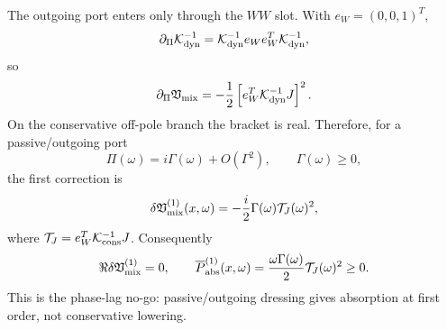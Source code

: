 The outgoing port enters only through the \(WW\) slot.  With \(e_W=(0,0,1)^T\),
\begin{equation}
\label{eq:part07-outgoing-derivative}
\partial_\Pi \mathcal K_{\rm dyn}^{-1}
=
\mathcal K_{\rm dyn}^{-1}e_We_W^T\mathcal K_{\rm dyn}^{-1},
\end{equation}
so
\begin{equation}
\label{eq:part07-vmix-pi-derivative}
\partial_\Pi\mathfrak V_{\rm mix}
=-\frac12\left[e_W^T\mathcal K_{\rm dyn}^{-1}J\right]^2.
\end{equation}
On the conservative off-pole branch the bracket is real.  Therefore, for a passive/outgoing port
\begin{equation}
\label{eq:part07-passive-pi}
\Pi(\omega)=i\Gamma(\omega)+O(\Gamma^2),
\qquad
\Gamma(\omega)\ge0,
\end{equation}
the first correction is
\begin{equation}
\label{eq:part07-phase-lag-correction}
\delta\mathfrak V_{\rm mix}^{(1)}(x,\omega)
=-\frac{i}{2}\Gamma(\omega)\mathcal T_J(\omega)^2,
\end{equation}
where \(\mathcal T_J=e_W^T\mathcal K_{\rm cons}^{-1}J\).  Consequently
\begin{equation}
\label{eq:part07-phase-lag-no-real}
\Re\delta\mathfrak V_{\rm mix}^{(1)}=0,
\qquad
\overline P_{\rm abs}^{(1)}(x,\omega)
=\frac{\omega\Gamma(\omega)}{2}\mathcal T_J(\omega)^2\ge0.
\end{equation}
This is the phase-lag no-go: passive/outgoing dressing gives absorption at first order, not conservative lowering.

